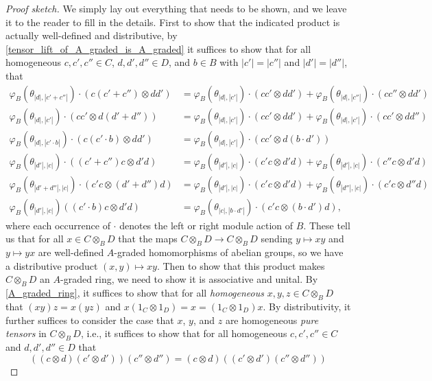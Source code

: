 \documentclass[../main.tex]{subfiles}
\begin{document}
\begin{proof}[Proof sketch]
	We simply lay out everything that needs to be shown, and we leave it to the reader to fill in the details. First to show that the indicated product is actually well-defined and distributive, by \autoref{tensor_lift_of_A_graded_is_A_graded} it suffices to show that for all homogeneous $c,c',c''\in C$, $d,d',d''\in D$, and $b\in B$ with $|c'|=|c''|$ and $|d'|=|d''|$, that
	\begin{align*}
		\varphi_B(\theta_{|d|,|c'+c''|})\cdot(c(c'+c'')\otimes dd')&=\varphi_B(\theta_{|d|,|c'|})\cdot(cc'\otimes dd')+\varphi_B(\theta_{|d|,|c''|})\cdot (cc''\otimes dd') \\
		\varphi_B(\theta_{|d|,|c'|})\cdot (cc'\otimes d(d'+d''))&=\varphi_B(\theta_{|d|,|c'|})\cdot(cc'\otimes dd')+\varphi_B(\theta_{|d|,|c'|})\cdot(cc'\otimes dd'') \\
		\varphi_B(\theta_{|d|,|c'\cdot b|})\cdot (c(c'\cdot b)\otimes dd')&=\varphi_B(\theta_{|d|,|c'|})\cdot(cc'\otimes d(b\cdot d')) \\
		\varphi_B(\theta_{|d'|,|c|})\cdot((c'+c'')c\otimes d'd)&=\varphi_B(\theta_{|d'|,|c|})\cdot(c'c\otimes d'd)+\varphi_B(\theta_{|d'|,|c|})\cdot(c''c\otimes d'd) \\
		\varphi_B(\theta_{|d'+d''|,|c|})\cdot(c'c\otimes (d'+d'')d)&=\varphi_B(\theta_{|d'|,|c|})\cdot(c'c\otimes d'd)+\varphi_B(\theta_{|d''|,|c|})\cdot(c'c\otimes d''d) \\
		\varphi_B(\theta_{|d'|,|c|})((c'\cdot b)c\otimes d'd)&=\varphi_B(\theta_{|c|,|b\cdot d'|})\cdot (c'c\otimes (b\cdot d')d),
	\end{align*}
	where each occurrence of $\cdot$ denotes the left or right module action of $B$. These tell us that for all $x\in C\otimes_BD$ that the maps $C\otimes_BD\to C\otimes_BD$ sending $y\mapsto xy$ and $y\mapsto yx$ are well-defined $A$-graded homomorphisms of abelian groups, so we have a distributive product $(x,y)\mapsto xy$. Then to show that this product makes $C\otimes_BD$ an $A$-graded ring, we need to show it is associative and unital. By \autoref{A_graded_ring}, it suffices to show that for all \emph{homogeneous} $x,y,z\in C\otimes_BD$ that $(xy)z=x(yz)$ and $x(1_C\otimes 1_D)=x=(1_C\otimes 1_D)x$. By distributivity, it further suffices to consider the case that $x$, $y$, and $z$ are homogeneous \emph{pure tensors} in $C\otimes_BD$, i.e., it suffices to show that for all homogeneous $c,c',c''\in C$ and $d,d',d''\in D$ that
	\[((c\otimes d)(c'\otimes d'))(c''\otimes d'')=(c\otimes d)((c'\otimes d')(c''\otimes d''))\]

\end{proof}
\end{document}
